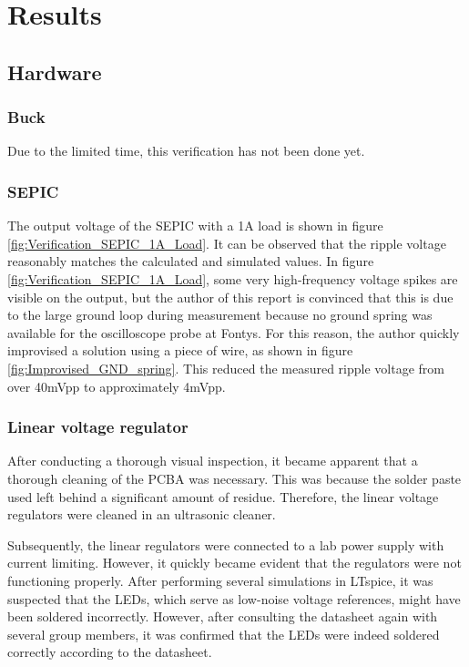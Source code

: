 \section{Results}

\subsection{Hardware}

\subsubsection{Buck}
Due to the limited time, this verification has not been done yet.

\subsubsection{SEPIC}
The output voltage of the SEPIC with a 1A load is shown in figure \ref{fig:Verification_SEPIC_1A_Load}. It can be observed that the ripple voltage reasonably matches the calculated and simulated values. In figure \ref{fig:Verification_SEPIC_1A_Load}, some very high-frequency voltage spikes are visible on the output, but the author of this report is convinced that this is due to the large ground loop during measurement because no ground spring was available for the oscilloscope probe at Fontys. For this reason, the author quickly improvised a solution using a piece of wire, as shown in figure \ref{fig:Improvised_GND_spring}. This reduced the measured ripple voltage from over 40mVpp to approximately 4mVpp.

\subsubsection{Linear voltage regulator}
After conducting a thorough visual inspection, it became apparent that a thorough cleaning of the PCBA was necessary. This was because the solder paste used left behind a significant amount of residue. Therefore, the linear voltage regulators were cleaned in an ultrasonic cleaner.

Subsequently, the linear regulators were connected to a lab power supply with current limiting. However, it quickly became evident that the regulators were not functioning properly. After performing several simulations in LTspice, it was suspected that the LEDs, which serve as low-noise voltage references, might have been soldered incorrectly. However, after consulting the datasheet again with several group members, it was confirmed that the LEDs were indeed soldered correctly according to the datasheet.

